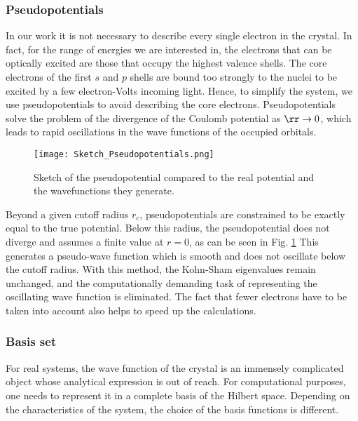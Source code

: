 \subsubsection{Pseudopotentials}
In our work it is not necessary to describe every single electron in the crystal. In fact, for the range of energies we are interested in, the electrons that can be optically excited are those that occupy the highest valence shells.
The core electrons of the first $s$ and $p$ shells are bound too strongly to the nuclei to be excited by a few electron-Volts incoming light. Hence, to simplify the system, we use pseudopotentials to avoid describing the core electrons. Pseudopotentials solve the problem of the divergence of the Coulomb potential as $\rr \to 0$, which leads to rapid oscillations in the wave functions of the occupied orbitals.\cite{martin2020electronic}
\begin{figure}[h!tbp]
	\vspace{0.5cm}
	\setcapindent{2em}
	\centering
	\texttt{[image: Sketch\_Pseudopotentials.png]}
	\caption{Sketch of the pseudopotential compared to the real potential and the wavefunctions they generate.}
	\label{fig:sketch_pseudo}
\end{figure}
Beyond a given cutoff radius $r_c$, pseudopotentials are constrained to be exactly equal to the true potential. Below this radius, the pseudopotential does not diverge and assumes a finite value at $r=0$, as can be seen in Fig. \ref{fig:sketch_pseudo} This generates a pseudo-wave function which is smooth and does not oscillate below the cutoff radius. With this method, the Kohn-Sham eigenvalues remain unchanged, and the computationally demanding task of representing the oscillating wave function is eliminated. The fact that fewer electrons have to be taken into account also helps to speed up the calculations.
%

\subsubsection{Basis set}
For real systems, the wave function of the crystal is an immensely complicated object whose analytical expression is out of reach. For computational purposes, one needs to represent it in a complete basis of the Hilbert space. Depending on the characteristics of the system, the choice of the basis functions is different.

